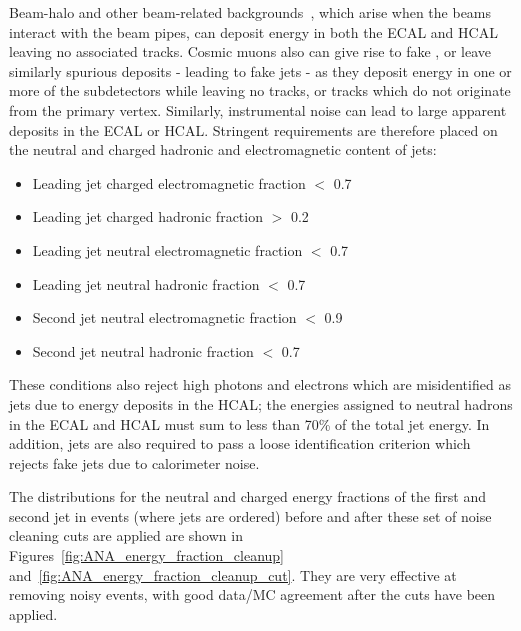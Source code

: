 Beam-halo and other beam-related backgrounds~\cite{bib:ANA_BeamHalo}, which arise when the beams interact with the beam pipes, 
can deposit energy in both the \ac{ECAL} and \ac{HCAL} leaving no associated tracks.
Cosmic muons also can give rise to fake \MET, 
or leave similarly spurious deposits - leading to fake jets - as they deposit energy in one or more of the subdetectors while leaving no tracks, or tracks which do not originate from the primary vertex.
Similarly, instrumental noise can lead to large apparent deposits in the \ac{ECAL} or \ac{HCAL}. 
Stringent requirements are therefore placed on the neutral and charged hadronic and electromagnetic content of jets:
\begin{itemize}
\item Leading jet charged electromagnetic fraction $<$ 0.7
\item Leading jet charged hadronic fraction $>$ 0.2
\item Leading jet neutral electromagnetic fraction $<$ 0.7
\item Leading jet neutral hadronic fraction $<$ 0.7
\item Second jet neutral electromagnetic fraction $<$ 0.9
\item Second jet neutral hadronic fraction $<$ 0.7
\end{itemize}
These conditions also reject high \pt photons and electrons which are misidentified as jets due to 
energy deposits in the \ac{HCAL}; the energies assigned to neutral hadrons in the 
ECAL and HCAL must sum to less than 70\% of the total jet energy.
In addition, jets are also required to pass a loose identification criterion which rejects fake jets due to calorimeter noise. 

The distributions for the neutral and charged energy fractions of the first and second jet in events (where jets are \pt ordered) before and after these set of noise cleaning cuts are applied are shown in Figures~\ref{fig:ANA_energy_fraction_cleanup} and~\ref{fig:ANA_energy_fraction_cleanup_cut}. 
They are very effective at removing noisy events, with good data/MC agreement after the cuts have been applied.


